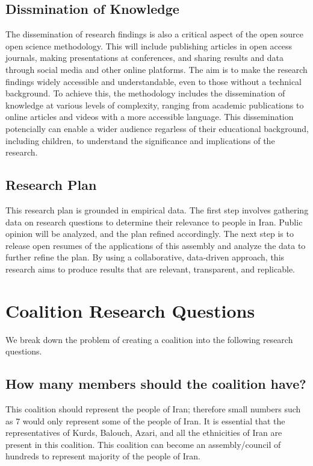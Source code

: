 \documentclass{IEEEtran}
\begin{document}
\subsection{Dissmination of Knowledge}
The dissemination of research findings is also a critical aspect of the open source open science methodology. This will include publishing articles in open access journals, making presentations at conferences, and sharing results and data through social media and other online platforms. The aim is to make the research findings widely accessible and understandable, even to those without a technical background.
To achieve this, the methodology includes the dissemination of knowledge at various levels of complexity, ranging from academic publications to online articles and videos with a more accessible language. This dissemination potencially can enable a wider audience regarless of their educational background, including children, to understand the significance and implications of the research.

\subsection{Research Plan}
This research plan is grounded in empirical data. The first step involves gathering data on research questions to determine their relevance to people in Iran. Public opinion will be analyzed, and the plan refined accordingly. The next step is to release open resumes of the applications of this assembly and analyze the data to further refine the plan.
By using a collaborative, data-driven approach, this research aims to produce results that are relevant, transparent, and replicable.

\section{Coalition Research Questions}
We break down the problem of creating a coalition into the following research questions.

\subsection{How many members should the coalition have?}
This coalition should represent the people of Iran; therefore small numbers such as 7 would only represent some of the people of Iran. 
It is essential that the representatives of Kurds, Balouch, Azari, and all the ethnicities of Iran are present in this coalition. This coalition can become an assembly/council of hundreds to represent majority of the people of Iran. 
\end{document}
